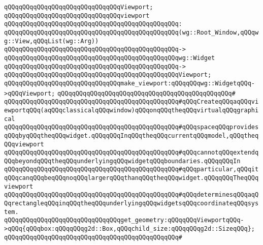 \newline
\verb|qQQqqQQqqQQqqQQqqQQqqQQqqQQqqQQqViewport;|\newline
\newline
\verb|qQQqqQQqqQQqqQQqqQQqqQQqqQQqqQQqviewport|\newline
\verb|qQQqqQQqqQQqqQQqqQQqqQQqqQQqqQQqqQQqqQQqqQQqqQQq:|\newline
\verb|qQQqqQQqqQQqqQQqqQQqqQQqqQQqqQQqqQQqqQQqqQQqqQQq(wg::Root_Window,qQQqwg::View,qQQqList(wg::Arg))|\newline
\verb|qQQqqQQqqQQqqQQqqQQqqQQqqQQqqQQqqQQqqQQqqQQqqQQq->|\newline
\verb|qQQqqQQqqQQqqQQqqQQqqQQqqQQqqQQqqQQqqQQqqQQqqQQqwg::Widget|\newline
\verb|qQQqqQQqqQQqqQQqqQQqqQQqqQQqqQQqqQQqqQQqqQQqqQQq->|\newline
\verb|qQQqqQQqqQQqqQQqqQQqqQQqqQQqqQQqqQQqqQQqqQQqqQQqViewport;|\newline
\newline
\verb|qQQqqQQqqQQqqQQqqQQqqQQqqQQqqQQqmake_viewport:qQQqqQQqwg::WidgetqQQq->qQQqViewport;|\newline
\verb|qQQqqQQqqQQqqQQqqQQqqQQqqQQqqQQqqQQqqQQqqQQqqQQq#|\newline
\verb|qQQqqQQqqQQqqQQqqQQqqQQqqQQqqQQqqQQqqQQqqQQqqQQq#qQQqCreateqQQqaqQQqviewportqQQq(aqQQqclassicalqQQqwindow)qQQqonqQQqtheqQQqvirtualqQQqgraphical|\newline
\verb|qQQqqQQqqQQqqQQqqQQqqQQqqQQqqQQqqQQqqQQqqQQqqQQq#qQQqspaceqQQqprovidesqQQqbyqQQqtheqQQqwidget.qQQqqQQqInqQQqtheqQQqcurrentqQQqmodel,qQQqtheqQQqviewport|\newline
\verb|qQQqqQQqqQQqqQQqqQQqqQQqqQQqqQQqqQQqqQQqqQQqqQQq#qQQqcannotqQQqextendqQQqbeyondqQQqtheqQQqunderlyingqQQqwidgetqQQqboundaries.qQQqqQQqIn|\newline
\verb|qQQqqQQqqQQqqQQqqQQqqQQqqQQqqQQqqQQqqQQqqQQqqQQq#qQQqparticular,qQQqitqQQqcanqQQqbeqQQqnoqQQqlargerqQQqthanqQQqtheqQQqwidget.qQQqqQQqTheqQQqviewport|\newline
\verb|qQQqqQQqqQQqqQQqqQQqqQQqqQQqqQQqqQQqqQQqqQQqqQQq#qQQqdeterminesqQQqaqQQqrectangleqQQqinqQQqtheqQQqunderlyingqQQqwidgetsqQQqcoordinateqQQqsystem.|\newline
\newline
\verb|qQQqqQQqqQQqqQQqqQQqqQQqqQQqqQQqget_geometry:qQQqqQQqViewportqQQq->qQQq{qQQqbox:qQQqqQQqg2d::Box,qQQqchild_size:qQQqqQQqg2d::SizeqQQq};|\newline
\verb|qQQqqQQqqQQqqQQqqQQqqQQqqQQqqQQqqQQqqQQqqQQqqQQq#|\newline

